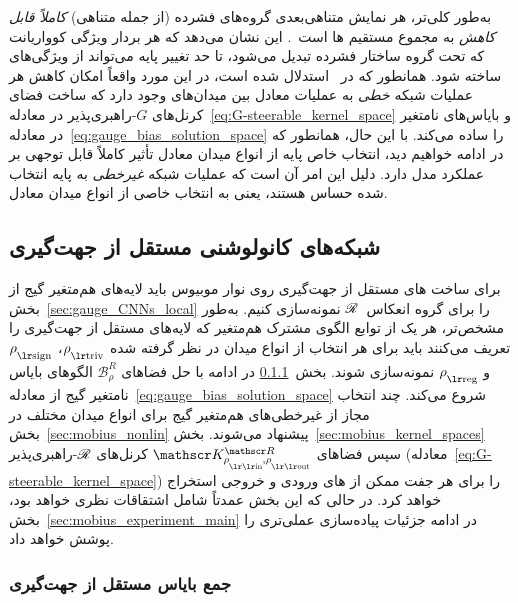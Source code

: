 به‌طور کلی‌تر، هر نمایش متناهی‌بعدی گروه‌های فشرده (از جمله متناهی) \emph{کاملاً قابل کاهش} به مجموع مستقیم ها است~\cite{gallier2019harmonicRepr,din2017reprLectureNotes,serre1977linear}.
این نشان می‌دهد که هر بردار ویژگی کوواریانت که تحت گروه ساختار فشرده تبدیل می‌شود، تا حد تغییر پایه می‌تواند از ویژگی‌های  ساخته شود.
همانطور که در~\cite{Weiler2019_E2CNN} استدلال شده است، در این مورد واقعاً امکان کاهش هر عملیات شبکه \emph{خطی} به عملیات معادل بین میدان‌های  وجود دارد که ساخت فضای کرنل‌های $G$-راهبری‌پذیر در معادله~\eqref{eq:G-steerable_kernel_space} و بایاس‌های نامتغیر در معادله~\eqref{eq:gauge_bias_solution_space} را ساده می‌کند.
با این حال، همانطور که در ادامه خواهیم دید، انتخاب خاص پایه از انواع میدان معادل تأثیر کاملاً قابل توجهی بر عملکرد مدل دارد.
دلیل این امر آن است که عملیات شبکه \emph{غیرخطی} به پایه انتخاب شده حساس هستند، یعنی به انتخاب خاصی از انواع میدان معادل.


\subsection{شبکه‌های کانولوشنی مستقل از جهت‌گیری}
\label{sec:mobius_cnn_ops_analytical}

برای ساخت های مستقل از جهت‌گیری روی نوار موبیوس باید لایه‌های هم‌متغیر گیج از بخش~\ref{sec:gauge_CNNs_local} را برای گروه انعکاس~$\mathscr{R}$ نمونه‌سازی کنیم.
به‌طور مشخص‌تر، هر یک از توابع الگوی مشترک هم‌متغیر که لایه‌های مستقل از جهت‌گیری را تعریف می‌کنند باید برای هر انتخاب از انواع میدان در نظر گرفته شده $\rhotriv$، $\rhosign$ و $\rhoreg$ نمونه‌سازی شوند.
بخش~\ref{sec:mobius_bias} در ادامه با حل فضاهای $\mathscr{B}^R_\rho$ الگوهای بایاس نامتغیر گیج از معادله~\eqref{eq:gauge_bias_solution_space} شروع می‌کند.
چند انتخاب مجاز از غیرخطی‌های هم‌متغیر گیج برای انواع میدان مختلف در بخش~\ref{sec:mobius_nonlin} پیشنهاد می‌شوند.
بخش~\ref{sec:mobius_kernel_spaces} سپس فضاهای $\KR$ کرنل‌های $\mathscr{R}$-راهبری‌پذیر (معادله~\eqref{eq:G-steerable_kernel_space}) را برای هر جفت ممکن از های ورودی و خروجی استخراج خواهد کرد.
در حالی که این بخش عمدتاً شامل اشتقاقات نظری خواهد بود، بخش~\ref{sec:mobius_experiment_main} در ادامه جزئیات پیاده‌سازی عملی‌تری را پوشش خواهد داد.

\subsubsection{جمع بایاس مستقل از جهت‌گیری}
\label{sec:mobius_bias}

